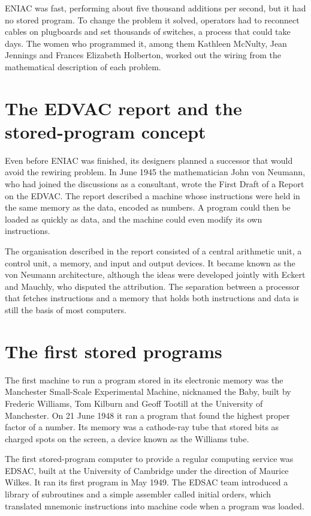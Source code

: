 \documentclass[11pt,a4paper]{article}
\begin{document}
ENIAC was fast, performing about five thousand additions per second, but it
had no stored program. To change the problem it solved, operators had to
reconnect cables on plugboards and set thousands of switches, a process that
could take days. The women who programmed it, among them Kathleen McNulty,
Jean Jennings and Frances Elizabeth Holberton, worked out the wiring from
the mathematical description of each problem.

\section{The EDVAC report and the stored-program concept}

Even before ENIAC was finished, its designers planned a successor that would
avoid the rewiring problem. In June 1945 the mathematician John von Neumann,
who had joined the discussions as a consultant, wrote the First Draft of a
Report on the EDVAC. The report described a machine whose instructions were
held in the same memory as the data, encoded as numbers. A program could
then be loaded as quickly as data, and the machine could even modify its own
instructions.

The organisation described in the report consisted of a central arithmetic
unit, a control unit, a memory, and input and output devices. It became
known as the von Neumann architecture, although the ideas were developed
jointly with Eckert and Mauchly, who disputed the attribution. The
separation between a processor that fetches instructions and a memory that
holds both instructions and data is still the basis of most computers.

\section{The first stored programs}

The first machine to run a program stored in its electronic memory was the
Manchester Small-Scale Experimental Machine, nicknamed the Baby, built by
Frederic Williams, Tom Kilburn and Geoff Tootill at the University of
Manchester. On 21 June 1948 it ran a program that found the highest proper
factor of a number. Its memory was a cathode-ray tube that stored bits as
charged spots on the screen, a device known as the Williams tube.

The first stored-program computer to provide a regular computing service was
EDSAC, built at the University of Cambridge under the direction of Maurice
Wilkes. It ran its first program in May 1949. The EDSAC team introduced a
library of subroutines and a simple assembler called initial orders, which
translated mnemonic instructions into machine code when a program was
loaded.
\end{document}
